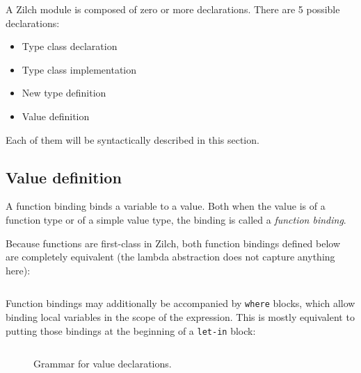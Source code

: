 A Zilch module is composed of zero or more declarations.
There are 5 possible declarations:
\begin{itemize}
	\item Type class declaration
	\item Type class implementation
	\item New type definition
	\item Value definition
\end{itemize}

\noindent Each of them will be syntactically described in this section.

\subsection{Value definition}\label{subsec:zilch-grammar-declarations-value}

A function binding binds a variable to a value.
Both when the value is of a function type or of a simple value type, the binding is called a \textit{function binding}.
\vspace*{\baselineskip}

Because functions are first-class in Zilch, both function bindings defined below are completely equivalent (the lambda abstraction does not capture anything here):

\noindent\inputminted{\zilchlexer}{examples/function-value-equivalence.zc}
\vspace*{\baselineskip}

Function bindings may additionally be accompanied by \verb|where| blocks, which allow binding local variables in the scope of the expression.
This is mostly equivalent to putting those bindings at the beginning of a \verb|let-in| block:

\noindent\inputminted{\zilchlexer}{examples/function-where-let-equivalence.zc}

\begin{figure}[H]
	\centering


	\caption{Grammar for value declarations.}
	\label{fig:zilch-grammar-declarations-value-grammar}
\end{figure}

